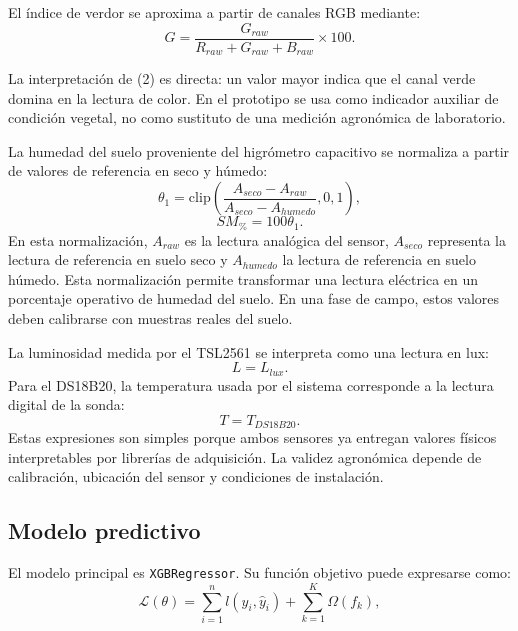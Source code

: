 \documentclass[conference,a4paper]{IEEEtran}
\begin{document}
El índice de verdor se aproxima a partir de canales RGB mediante:
\begin{equation}
G = \frac{G_{raw}}{R_{raw}+G_{raw}+B_{raw}}\times 100.
\end{equation}

La interpretación de (2) es directa: un valor mayor indica que el canal verde domina en la lectura de color. En el prototipo se usa como indicador auxiliar de condición vegetal, no como sustituto de una medición agronómica de laboratorio.

La humedad del suelo proveniente del higrómetro capacitivo se normaliza a partir de valores de referencia en seco y húmedo:
\begin{equation}
\theta_1 = \mathrm{clip}\left(\frac{A_{seco}-A_{raw}}{A_{seco}-A_{humedo}},0,1\right),
\end{equation}
\begin{equation}
SM_{\%}=100\theta_1.
\end{equation}
En esta normalización, $A_{raw}$ es la lectura analógica del sensor, $A_{seco}$ representa la lectura de referencia en suelo seco y $A_{humedo}$ la lectura de referencia en suelo húmedo. Esta normalización permite transformar una lectura eléctrica en un porcentaje operativo de humedad del suelo. En una fase de campo, estos valores deben calibrarse con muestras reales del suelo.

La luminosidad medida por el TSL2561 se interpreta como una lectura en lux:
\begin{equation}
L = L_{lux}.
\end{equation}
Para el DS18B20, la temperatura usada por el sistema corresponde a la lectura digital de la sonda:
\begin{equation}
T = T_{DS18B20}.
\end{equation}
Estas expresiones son simples porque ambos sensores ya entregan valores físicos interpretables por librerías de adquisición. La validez agronómica depende de calibración, ubicación del sensor y condiciones de instalación.

\subsection{Modelo predictivo}
El modelo principal es \texttt{XGBRegressor}. Su función objetivo puede expresarse como:
\begin{equation}
\mathcal{L}(\theta)=\sum_{i=1}^{n}l(y_i,\hat{y}_i)+\sum_{k=1}^{K}\Omega(f_k),
\end{equation}
\end{document}
